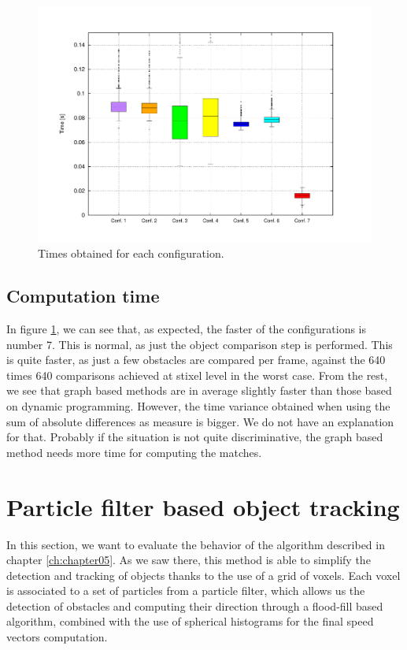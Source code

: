 \begin{figure}[h!]
\centering
\includegraphics[width=\textwidth,height=0.5\textwidth,trim=50 40 80 60,clip]{times_average}
\caption{Times obtained for each configuration.}\label{fig:cp04_times_average}
\end{figure}

\subsection{Computation time}\label{ch:chapter04_02_04}

In figure \ref{fig:cp04_times_average}, we can see that, as expected, the faster of the configurations is number 7. This is normal, as just the object comparison step is performed. This is quite faster, as just a few obstacles are compared per frame, against the 640 times 640 comparisons achieved at stixel level in the worst case. From the rest, we see that graph based methods are in average slightly faster than those based on dynamic programming. However, the time variance obtained when using the sum of absolute differences as measure is bigger. We do not have an explanation for that. Probably if the situation is not quite discriminative, the graph based method needs more time for computing the matches.

\FloatBarrier

\graphicspath{{./images/chapter05/bmps/}{./images/chapter05/vects/}{./images/chapter05/}}
\section{Particle filter based object tracking}\label{ch:chapter05_02}

In this section, we want to evaluate the behavior of the algorithm described in chapter \ref{ch:chapter05}. As we saw there, this method is able to simplify the detection and tracking of objects thanks to the use of a grid of voxels. Each voxel is associated to a set of particles from a particle filter, which allows us the detection of obstacles and computing their direction through a flood-fill based algorithm,  combined with the use of spherical histograms for the final speed vectors computation.

